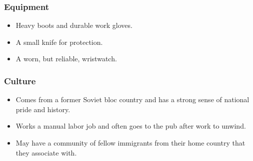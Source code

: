 \documentclass{book}
\begin{document}
\subsubsection{Equipment}
\begin{itemize}
    \item Heavy boots and durable work gloves.
    \item A small knife for protection.
    \item A worn, but reliable, wristwatch.
\end{itemize}
\subsubsection{Culture}
\begin{itemize}
    \item Comes from a former Soviet bloc country and has a strong sense of national pride and history.
    \item Works a manual labor job and often goes to the pub after work to unwind.
    \item May have a community of fellow immigrants from their home country that they associate with.
\end{itemize}
\end{document}
